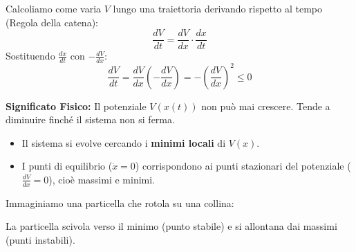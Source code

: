 \documentclass[openany]{book}
\theoremstyle{definition}
\theoremstyle{remark}
\begin{document}
Calcoliamo come varia $V$ lungo una traiettoria derivando rispetto al tempo (Regola della catena):
\[ \frac{dV}{dt} = \frac{dV}{dx} \cdot \frac{dx}{dt} \]
Sostituendo $\frac{dx}{dt}$ con $-\frac{dV}{dx}$:
\begin{equation}
    \frac{dV}{dt} = \frac{dV}{dx} \left( - \frac{dV}{dx} \right) = - \left( \frac{dV}{dx} \right)^2 \leq 0
\end{equation}

\textbf{Significato Fisico:} Il potenziale $V(x(t))$ non può mai crescere. Tende a diminuire finché il sistema non si ferma.
\begin{itemize}
    \item Il sistema si evolve cercando i \textbf{minimi locali} di $V(x)$.
    \item I punti di equilibrio ($\dot{x}=0$) corrispondono ai punti stazionari del potenziale ($\frac{dV}{dx}=0$), cioè massimi e minimi.
\end{itemize}

Immaginiamo una particella che rotola su una collina:
\begin{center}
\end{center}
La particella scivola verso il minimo (punto stabile) e si allontana dai massimi (punti instabili).
\end{document}
